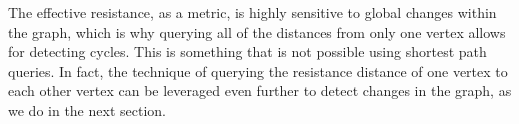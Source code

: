 {The effective resistance, as a metric, is highly sensitive to global changes within the graph, which is why querying all of the distances from only one vertex allows for detecting cycles. This is something that is not possible using shortest path queries.
In fact, the technique of querying the resistance distance of one vertex to each other vertex can be leveraged even further to detect changes in the graph, as we do in the next section. 
}

